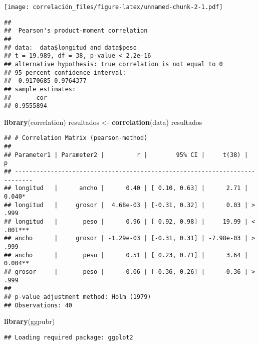 \documentclass[
]{article}
\newenvironment{Shaded}{\begin{snugshade}}{\end{snugshade}}
\newcommand{\FunctionTok}[1]{\textcolor[rgb]{0.13,0.29,0.53}{\textbf{#1}}}
\newcommand{\NormalTok}[1]{#1}
\newcommand{\OtherTok}[1]{\textcolor[rgb]{0.56,0.35,0.01}{#1}}
\newcommand{\SpecialCharTok}[1]{\textcolor[rgb]{0.81,0.36,0.00}{\textbf{#1}}}
\begin{document}
\texttt{[image: correlación\_files/figure-latex/unnamed-chunk-2-1.pdf]}

\begin{Shaded}
\end{Shaded}

\begin{verbatim}
## 
##  Pearson's product-moment correlation
## 
## data:  data$longitud and data$peso
## t = 19.989, df = 38, p-value < 2.2e-16
## alternative hypothesis: true correlation is not equal to 0
## 95 percent confidence interval:
##  0.9170685 0.9764377
## sample estimates:
##       cor 
## 0.9555894
\end{verbatim}

\begin{Shaded}
\begin{Highlighting}[]
\FunctionTok{library}\NormalTok{(correlation)}
\NormalTok{resultados }\OtherTok{\textless{}{-}} \FunctionTok{correlation}\NormalTok{(data)}
\NormalTok{resultados}
\end{Highlighting}
\end{Shaded}

\begin{verbatim}
## # Correlation Matrix (pearson-method)
## 
## Parameter1 | Parameter2 |         r |        95% CI |     t(38) |         p
## ---------------------------------------------------------------------------
## longitud   |      ancho |      0.40 | [ 0.10, 0.63] |      2.71 | 0.040*   
## longitud   |     grosor |  4.68e-03 | [-0.31, 0.32] |      0.03 | > .999   
## longitud   |       peso |      0.96 | [ 0.92, 0.98] |     19.99 | < .001***
## ancho      |     grosor | -1.29e-03 | [-0.31, 0.31] | -7.98e-03 | > .999   
## ancho      |       peso |      0.51 | [ 0.23, 0.71] |      3.64 | 0.004**  
## grosor     |       peso |     -0.06 | [-0.36, 0.26] |     -0.36 | > .999   
## 
## p-value adjustment method: Holm (1979)
## Observations: 40
\end{verbatim}

\begin{Shaded}
\begin{Highlighting}[]
\FunctionTok{library}\NormalTok{(ggpubr)}
\end{Highlighting}
\end{Shaded}

\begin{verbatim}
## Loading required package: ggplot2
\end{verbatim}
\end{document}
